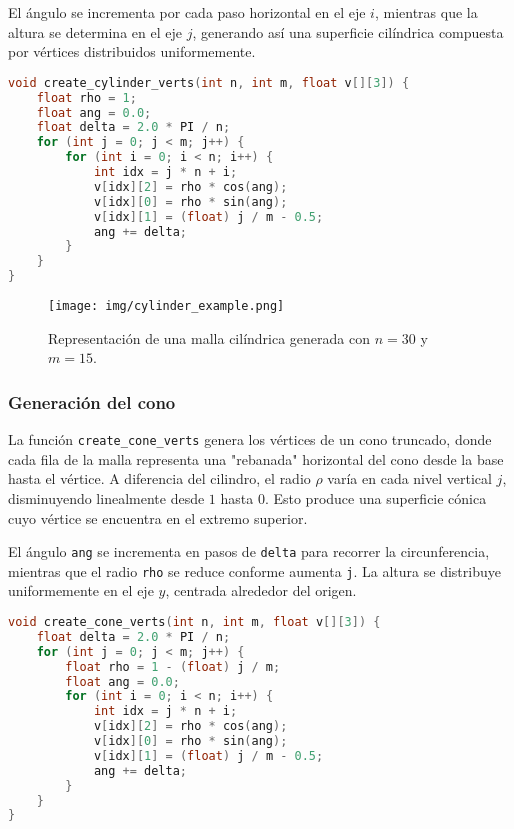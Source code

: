 \documentclass[12pt]{article}
\begin{document}
    El ángulo se incrementa por cada paso horizontal en el eje $i$, mientras que la altura se determina en el eje $j$, generando así una superficie cilíndrica compuesta por vértices distribuidos uniformemente.

    \begin{lstlisting}[language=C, caption={Generación de vértices para un cilindro}]
void create_cylinder_verts(int n, int m, float v[][3]) {
    float rho = 1;
    float ang = 0.0;
    float delta = 2.0 * PI / n;
    for (int j = 0; j < m; j++) {
        for (int i = 0; i < n; i++) {
            int idx = j * n + i;
            v[idx][2] = rho * cos(ang);
            v[idx][0] = rho * sin(ang);
            v[idx][1] = (float) j / m - 0.5;
            ang += delta;
        }
    }
}
    \end{lstlisting}

    \begin{figure}[H]
        \centering
        \texttt{[image: img/cylinder\_example.png]}
        \caption{Representación de una malla cilíndrica generada con $n = 30$ y $m = 15$.}
    \end{figure}


    \subsubsection{Generación del cono}

    La función \texttt{create\_cone\_verts} genera los vértices de un cono truncado, donde cada fila de la malla representa una "rebanada" horizontal del cono desde la base hasta el vértice. A diferencia del cilindro, el radio $\rho$ varía en cada nivel vertical $j$, disminuyendo linealmente desde $1$ hasta $0$. Esto produce una superficie cónica cuyo vértice se encuentra en el extremo superior.

    El ángulo \texttt{ang} se incrementa en pasos de \texttt{delta} para recorrer la circunferencia, mientras que el radio \texttt{rho} se reduce conforme aumenta \texttt{j}. La altura se distribuye uniformemente en el eje $y$, centrada alrededor del origen.

    \begin{lstlisting}[language=C, caption={Generación de vértices para un cono}]
void create_cone_verts(int n, int m, float v[][3]) {
    float delta = 2.0 * PI / n;
    for (int j = 0; j < m; j++) {
        float rho = 1 - (float) j / m;
        float ang = 0.0;
        for (int i = 0; i < n; i++) {
            int idx = j * n + i;
            v[idx][2] = rho * cos(ang);
            v[idx][0] = rho * sin(ang);
            v[idx][1] = (float) j / m - 0.5;
            ang += delta;
        }
    }
}
    \end{lstlisting}
\end{document}
